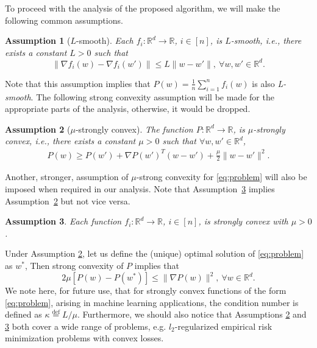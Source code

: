 \documentclass{article}
\makeatletter
\newtheorem{ass}{Assumption}
\newcommand{\tc}[1]{\textcolor{Magenta}{\bf #1}}
\DeclareMathOperator{\R}{\mathbb{R}}
\newcommand{\eqdef}{\stackrel{\text{def}}{=}}
\newcommand{\setn}{[n]}
\renewcommand{\top}{T}
\newcounter{subass}
\newenvironment{subass}
 {%
  \setcounter{subass}{0}%
  \stepcounter{ass}%
  \edef\saved@ass{\theass}%
  \let\c@ass\c@subass     %
  \renewcommand{\theass}{\saved@ass\alph{ass}}%
 }
 {}
\makeatother
\begin{document}
To proceed with the analysis of the proposed algorithm, we will make the following common assumptions.
\begin{ass}[$L$-smooth]
\label{ass_Lsmooth}
Each $f_i: \mathbb{R}^d \to \mathbb{R}$, $i \in \setn$, is $L$-smooth, i.e., there exists a constant $L > 0$ such that
$$
\| \nabla f_i(w) - \nabla f_i(w') \| \leq L \| w - w' \|, \ \forall w,w' \in \mathbb{R}^d.
$$
\end{ass}
 Note that this assumption implies that $P(w) = \frac{1}{n}\sum_{i=1}^n f_i(w)$ is also \emph{L-smooth}. The following strong convexity assumption
 will be made for the appropriate parts of the analysis, otherwise, it would be dropped.  
\begin{subass}
\begin{ass}[$\mu$-strongly convex]
\label{ass_stronglyconvex}
The function $P: \mathbb{R}^d \to \mathbb{R}$, is $\mu$-strongly convex, i.e., there exists a constant $\mu > 0$ such that $\forall w,w' \in \mathbb{R}^d$, 
\begin{gather*}
P(w)   \geq  P(w') + \nabla P(w')^\top (w - w') + \tfrac{\mu}{2}\|w - w'\|^2.
\end{gather*}
\end{ass}
Another, stronger, assumption of $\mu$-strong convexity for \eqref{eq:problem} will also be imposed when required in our analysis. Note that Assumption~\ref{ass_stronglyconvex2} implies Assumption~\ref{ass_stronglyconvex} but not vice versa.
\begin{ass}
\label{ass_stronglyconvex2}
Each function $f_i: \mathbb{R}^d \to \mathbb{R}$, $i \in \setn$, is strongly convex with $\mu>0$. 
\end{ass}
\end{subass}
Under Assumption \ref{ass_stronglyconvex}, let us define the (unique) optimal solution of \eqref{eq:problem} as $w^{*}$, 
Then strong convexity of $P$  implies that 
 \begin{equation}\label{eq:strongconvexity2}
 2\mu [ P(w) - P(w^{*})] \leq  \| \nabla P(w)\|^2, \ \forall w \in \mathbb{R}^d. 
 \end{equation}
We note here, for future use, that for strongly convex functions of the form \eqref{eq:problem}, arising in machine learning applications, the condition number is defined as $\kappa\eqdef L/\mu$. Furthermore, we should also notice that Assumptions \ref{ass_stronglyconvex} and \ref{ass_stronglyconvex2} both cover a wide range of problems, e.g. $l_2$-regularized empirical risk minimization problems with convex losses. 
\end{document}
